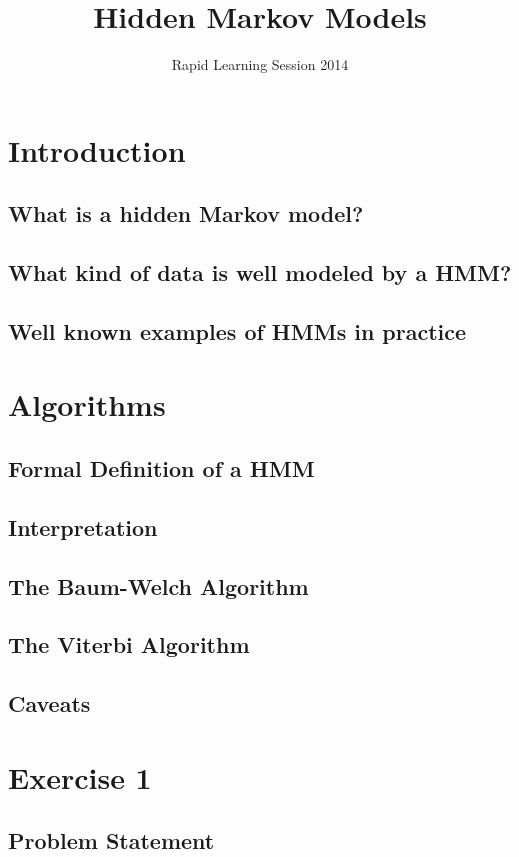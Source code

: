 \documentclass[11pt, oneside]{article}
\title{Hidden Markov Models}
\author{Rapid Learning Session 2014}
\date{}
\begin{document}
\maketitle

\section{Introduction}
\subsection{What is a hidden Markov model?}
\subsection{What kind of data is well modeled by a HMM?}
\subsection{Well known examples of HMMs in practice}

\section{Algorithms}
\subsection{Formal Definition of a HMM}
\subsection{Interpretation}
\subsection{The Baum-Welch Algorithm}
\subsection{The Viterbi Algorithm}
\subsection{Caveats}

\section{Exercise 1}
\subsection{Problem Statement}
\end{document}

